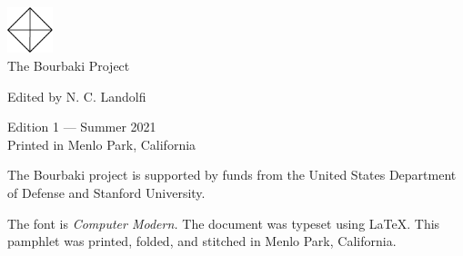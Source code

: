 




\usepackage{tocloft}
\setlength{\cftsecnumwidth}{3em}



\begin{center}
  \includegraphics[width=0.1\textwidth]{../trademark}
  \\
  \vspace{0.5cm}
  \textsf{\Large The Bourbaki Project}

{\small \textsf{Edited by N. C. Landolfi}}
\end{center}

\vspace{\fill}

\begin{center}
  {\small \textsf{Edition 1 --- Summer 2021}} \\

  {\footnotesize \textsf{Printed in Menlo Park, California}}
\end{center}

\thispagestyle{empty}

% 
% 
\clearpage

\tableofcontents
\blankpage

\clearpage



\clearpage


The Bourbaki project is supported by funds from the United States Department of Defense and Stanford University.

\clearpage

\noindent\noindent The font is \textit{Computer Modern.}
The document was typeset using \LaTeX.
This pamphlet was printed, folded, and stitched in Menlo Park, California.


